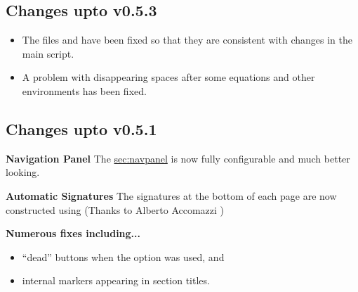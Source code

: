 \subsection{Changes upto v0.5.3}
\begin{itemize}
\item The files  and 
 have been fixed
so that they are consistent with changes in the main script.
\item A problem with disappearing spaces after some equations
and other environments has been fixed.
\end{itemize}
\subsection{Changes upto v0.5.1}
\begin{htmllist}
\item[\textbf{Navigation Panel}]
The \hyperref{navigation panel}{navigation panel (see section
}{)}{sec:navpanel}
is now fully configurable and much better looking.
\item[\textbf{Automatic Signatures}]
The signatures at the bottom of each page are now constructed
using  (Thanks to Alberto Accomazzi
)
\item[\textbf{Numerous fixes including...}] \hfill
\begin{itemize}
\item ``dead''  buttons when the  option
was used, and
\item internal \latextohtml{} markers appearing in section titles.
\end{itemize}
\end{htmllist}

